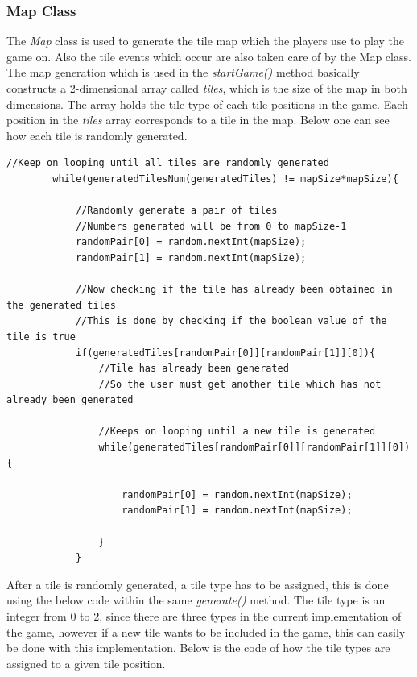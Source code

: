 \documentclass[a4paper,12pt]{extarticle}
\begin{document}
\subsubsection{Map Class}
\noindent The \textit{Map} class is used to generate the tile map which the players use to play the game on. Also the tile events which occur are also taken care of by the Map class.\\

\noindent The map generation which is used in the \textit{startGame()} method basically constructs a 2-dimensional array called \textit{tiles}, which is the size of the map in both dimensions. The array holds the tile type of each tile positions in the game. Each position in the \textit{tiles} array corresponds to a tile in the map. Below one can see how each tile is randomly generated.

\begin{lstlisting}
//Keep on looping until all tiles are randomly generated
        while(generatedTilesNum(generatedTiles) != mapSize*mapSize){

            //Randomly generate a pair of tiles
            //Numbers generated will be from 0 to mapSize-1
            randomPair[0] = random.nextInt(mapSize);
            randomPair[1] = random.nextInt(mapSize);

            //Now checking if the tile has already been obtained in the generated tiles
            //This is done by checking if the boolean value of the tile is true
            if(generatedTiles[randomPair[0]][randomPair[1]][0]){
                //Tile has already been generated
                //So the user must get another tile which has not already been generated

                //Keeps on looping until a new tile is generated
                while(generatedTiles[randomPair[0]][randomPair[1]][0]){

                    randomPair[0] = random.nextInt(mapSize);
                    randomPair[1] = random.nextInt(mapSize);

                }
            }
\end{lstlisting}
\vspace{4mm}

After a tile is randomly generated, a tile type has to be assigned, this is done using the below code within the same \textit{generate()} method. The tile type is an integer from 0 to 2, since there are three types in the current implementation of the game, however if a new tile wants to be included in the game, this can easily be done with this implementation. Below is the code of how the tile types are assigned to a given tile position.
\end{document}
